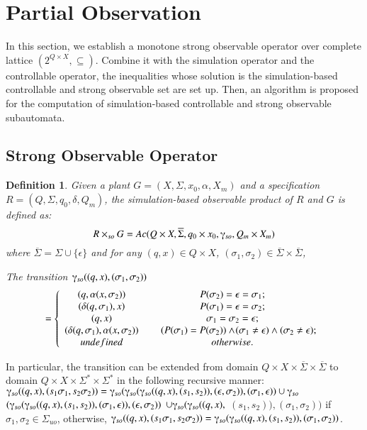 \documentclass[12pt,draftcls,onecolumn]{IEEEtran}
\newtheorem{Definition}{Definition}
\begin{document}
\section{Partial Observation}
In this section, we establish a monotone strong observable operator
over complete lattice $(2^{Q \times X}, \subseteq)$. Combine it with
the simulation operator and the controllable operator, the
inequalities whose solution is the simulation-based controllable and
strong observable set are set up. Then, an algorithm is proposed for
the computation of simulation-based controllable and strong
observable subautomata.





\subsection{Strong Observable Operator}



\begin{Definition}
Given a plant $G =(X,\Sigma,x_{0},\alpha,X_{m})$ and a
specification $R =(Q,\Sigma,q_{0},\delta,Q_{m})$, the
simulation-based observable product of $R$ and $G$ is defined as:
\[
R \times_{so} G = Ac(Q \times X, \overline{\Sigma}, q_0 \times x_0,
\gammaup_{so}, Q_m \times X_m)
\]
where $ \overline{\Sigma} = \Sigma\cup\{\epsilon\}$ and for any
$(q, x) \in Q \times X$, $(\sigma_1, \sigma_2) \in
\overline{\Sigma} \times \overline{\Sigma}$,

The transition $\gammaup_{so}((q,x), (\sigma_1,\sigma_2))$
\[
= \left\{ {\begin{array}{*{20}c}
   ( q, \alpha(x, \sigma_2))  &{P(\sigma_2)=\epsilon=\sigma_1};  \\
   (\delta(q, \sigma_1), x)  & {P(\sigma_1)=\epsilon=\sigma_2};  \\
   (q, x)  & {\sigma_1=\sigma_2=\epsilon};  \\
   (\delta(q, \sigma_1), \alpha (x, \sigma_2))  & {~~~~~(P(\sigma_1)=P(\sigma_2)) \wedge \!(\sigma_1 \neq \epsilon) \wedge (\sigma_2 \neq \epsilon) };  \\
   undefined  &{otherwise}. \\
\end{array}} \right.
\]
\end{Definition}

In particular, the transition can be extended from domain $Q
\times X \times  \overline{\Sigma} \times  \overline{\Sigma}$ to
domain $Q \times X \times \Sigma^{*} \times \Sigma^{*}$ in the
following recursive manner: $\gammaup_{so}((q,x),
(s_1\sigma_1,s_2\sigma_2))=
\gammaup_{so}(\gammaup_{so}(\gammaup_{so}((q,x), (s_1,s_2)),
(\epsilon, \sigma_2)), (\sigma_1, \epsilon))\cup \gammaup_{so}$
$(\gammaup_{so}(\gammaup_{so}((q,x), (s_1,s_2)), (\sigma_1,
\epsilon)), (\epsilon, \sigma_2)) $ $\cup
\gammaup_{so}(\gammaup_{so}((q,x),$ $(s_1,s_2)), (\sigma_1,
\sigma_2))$ if $\sigma_1, \sigma_2 \in \Sigma_{uo}$, otherwise,
$\gammaup_{so}((q,x), (s_1\sigma_1,s_2\sigma_2))=
\gammaup_{so}(\gammaup_{so}((q,x), (s_1,s_2)), (\sigma_1,
\sigma_2))$.
\end{document}
